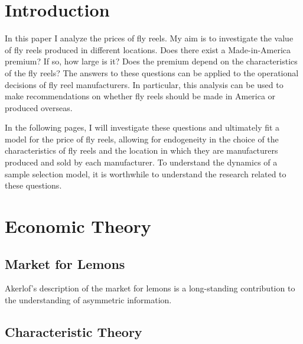 %
%
%

\section{Introduction}

In this paper I analyze the prices of fly reels. 
My aim is to investigate the value of fly reels produced in different locations.
Does there exist a Made-in-America premium? 
If so, how large is it?
Does the premium depend on the characteristics of the fly reels?
% 
The answers to these questions can be applied to the 
operational decisions of fly reel manufacturers.
In particular, this analysis can be used to make recommendations
on whether fly reels should be made in America or produced overseas. 
% 

In the following pages, I will investigate these questions and
ultimately fit a model for the price of fly reels, 
allowing for endogeneity in the choice of the
characteristics of fly reels 
and the location in which they are manufacturers
produced and sold by each manufacturer. 
To understand the dynamics of a sample selection model, 
it is worthwhile to understand the research related to these questions. 



\section{Economic Theory}

\subsection{Market for Lemons}


Akerlof's description of the market for lemons is a long-standing contribution to the understanding of asymmetric information. 


\subsection{Characteristic Theory}

